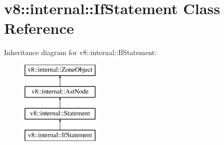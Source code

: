 \hypertarget{classv8_1_1internal_1_1_if_statement}{}\section{v8\+:\+:internal\+:\+:If\+Statement Class Reference}
\label{classv8_1_1internal_1_1_if_statement}
Inheritance diagram for v8\+:\+:internal\+:\+:If\+Statement\+:\begin{figure}[H]
\begin{center}
\leavevmode
\includegraphics[height=4.000000cm]{classv8_1_1internal_1_1_if_statement}
\end{center}
\end{figure}
